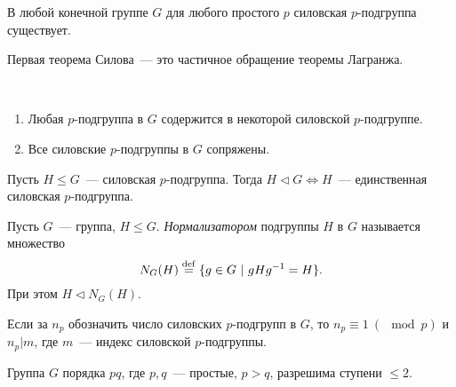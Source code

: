         \begin{theorem*}
            В любой конечной группе $G$ для любого простого $p$ силовская $p$-подгруппа существует. 
        \end{theorem*}
        \begin{remark}
            Первая теорема Силова~--- это частичное обращение теоремы Лагранжа.
        \end{remark}
        \begin{theorem*}
            \
            \begin{enumerate}
            \setlength\itemsep{0.1em}
                \item Любая $p$-подгруппа в $G$ содержится в некоторой силовской $p$-подгруппе. 
                \item Все силовские $p$-подгруппы в $G$ сопряжены.
            \end{enumerate}
        \end{theorem*}
        \begin{consequence*}
            Пусть ${H \leqslant G}$~--- силовская $p$-подгруппа. Тогда ${H \lhd G \Leftrightarrow H}$~--- единственная силовская $p$-подгруппа.
        \end{consequence*}
        \begin{definition}
            Пусть $G$~--- группа, ${H \leqslant G.}$ \textit{Нормализатором} подгруппы $H$ в $G$ называется множество
            \begin{equation*}
                N_G(H) \stackrel{\mathrm{def}}{=} \{g \in G \ | \ gHg^{-1} = H\}.
            \end{equation*}
            При этом ${H \lhd N_G(H).}$
        \end{definition}
        \begin{theorem*}
             Если за $n_p$ обозначить число силовских $p$-подгрупп в $G$, то $n_p \equiv 1 \ (\mod p)$ и $n_p|m$, где $m$~--- индекс силовской $p$-подгруппы. 
        \end{theorem*}
        \begin{consequence*}
             Группа $G$ порядка $pq$, где $p,q$~--- простые, ${p > q}$, разрешима ступени $\leqslant2$.
        \end{consequence*}